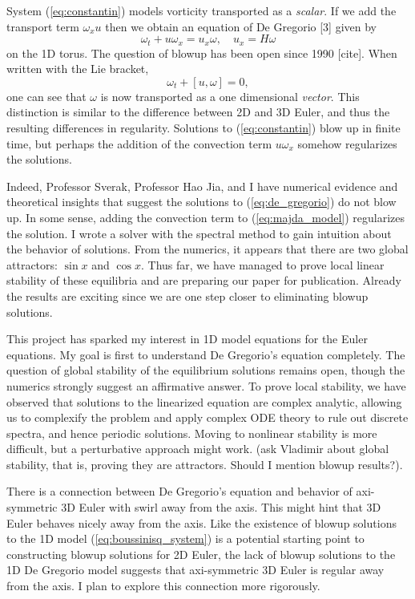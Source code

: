 \documentclass[12pt]{article}
\begin{document}
System (\ref{eq:constantin}) models vorticity transported as a \textit{scalar}. If we add the transport term $\omega_x u$ then we obtain an equation of De Gregorio [3] given by
\[
	\omega_t + u \omega_x = u_x \omega, \quad u_x = H \omega
\]
on the 1D torus. The question of blowup has been open since 1990 [cite]. When written with the Lie bracket, 
\[
	\omega_t + [u, \omega] = 0,
\]
one can see that $\omega$ is now transported as a one dimensional \textit{vector}. This distinction is similar to the difference between 2D and 3D Euler, and thus the resulting differences in regularity. Solutions to (\ref{eq:constantin}) blow up in finite time, but perhaps the addition of the convection term $u \omega_x$ somehow regularizes the solutions.

Indeed, Professor Sverak, Professor Hao Jia, and I have numerical evidence and theoretical insights that suggest the solutions to (\ref{eq:de_gregorio}) do not blow up. In some sense, adding the convection term to (\ref{eq:majda_model}) regularizes the solution. I wrote a solver with the spectral method to gain intuition about the behavior of solutions. From the numerics, it appears that there are two global attractors: $\sin x$ and $\cos x$. Thus far, we have managed to prove local linear stability of these equilibria and are preparing our paper for publication. Already the results are exciting since we are one step closer to eliminating blowup solutions. 

This project has sparked my interest in 1D model equations for the Euler equations. My goal is first to understand De Gregorio's equation completely. The question of global stability of the equilibrium solutions remains open, though the numerics strongly suggest an affirmative answer. To prove local stability, we have observed that solutions to the linearized equation are complex analytic, allowing us to complexify the problem and apply complex ODE theory to rule out discrete spectra, and hence periodic solutions. Moving to nonlinear stability is more difficult, but a perturbative approach might work. (ask Vladimir about global stability, that is, proving they are attractors. Should I mention blowup results?).

There is a connection between De Gregorio's equation and behavior of axi-symmetric 3D Euler with swirl away from the axis. This might hint that 3D Euler behaves nicely away from the axis. Like the existence of blowup solutions to the 1D model (\ref{eq:boussinisq_system}) is a potential starting point to constructing blowup solutions for 2D Euler, the lack of blowup solutions to the 1D De Gregorio model suggests that axi-symmetric 3D Euler is regular away from the axis. I plan to explore this connection more rigorously.
\end{document}
